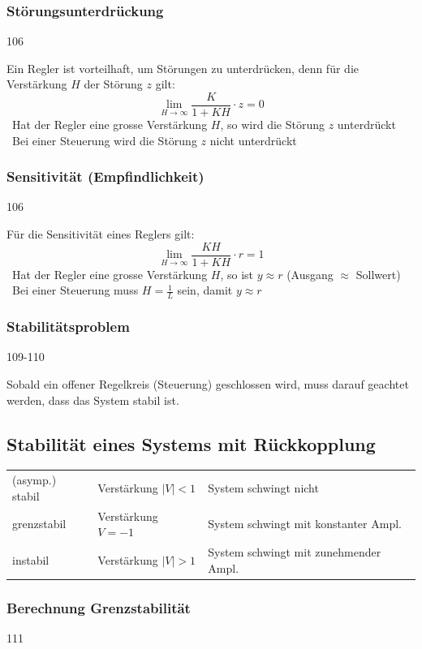 \subsubsection{Störungsunterdrückung}{106}

    Ein Regler ist vorteilhaft, um Störungen zu unterdrücken, denn für die Verstärkung $H$ der Störung $z$ gilt:
    $$ \lim\limits_{H \to \infty} \frac{K}{1 + K H} \cdot z = 0 $$
    \textrightarrow\ Hat der Regler eine grosse Verstärkung $H$, so wird die Störung $z$ unterdrückt\\
    \textrightarrow\ Bei einer Steuerung wird die Störung $z$ nicht unterdrückt


\subsubsection{Sensitivität (Empfindlichkeit)}{106}

    Für die Sensitivität eines Reglers gilt:
    $$ \lim\limits_{H \to \infty} \frac{K H}{1 + K H} \cdot r = 1 $$
    \textrightarrow\ Hat der Regler eine grosse Verstärkung $H$, so ist $y \approx r$ (Ausgang $\approx$ Sollwert)\\
    \textrightarrow\ Bei einer Steuerung muss $H = \frac{1}{L}$ sein, damit $y \approx r$


\subsubsection{Stabilitätsproblem}{109-110}

    Sobald ein offener Regelkreis (Steuerung) geschlossen wird, muss darauf geachtet werden, dass das System stabil ist.
    

\subsection{Stabilität eines Systems mit Rückkopplung}

    \begin{tabular}{lll}
        (asymp.) stabil     & Verstärkung $|V| < 1$ & System schwingt nicht \\
        grenzstabil         & Verstärkung $V = -1$  & System schwingt mit konstanter Ampl.\\
        instabil            & Verstärkung $|V| > 1$ & System schwingt mit zunehmender Ampl. 
    \end{tabular}


\subsubsection{Berechnung Grenzstabilität}{111}

